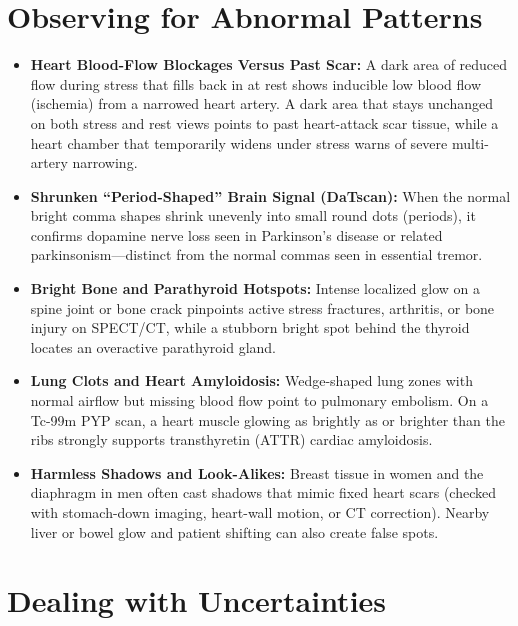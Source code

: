 \section{Observing for Abnormal Patterns}

\begin{itemize}
    \item \textbf{Heart Blood-Flow Blockages Versus Past Scar:} A dark area of reduced flow during stress that fills back in at rest shows inducible low blood flow (ischemia) from a narrowed heart artery. A dark area that stays unchanged on both stress and rest views points to past heart-attack scar tissue, while a heart chamber that temporarily widens under stress warns of severe multi-artery narrowing.
    \item \textbf{Shrunken ``Period-Shaped'' Brain Signal (DaTscan):} When the normal bright comma shapes shrink unevenly into small round dots (periods), it confirms dopamine nerve loss seen in Parkinson's disease or related parkinsonism---distinct from the normal commas seen in essential tremor.
    \item \textbf{Bright Bone and Parathyroid Hotspots:} Intense localized glow on a spine joint or bone crack pinpoints active stress fractures, arthritis, or bone injury on SPECT/CT, while a stubborn bright spot behind the thyroid locates an overactive parathyroid gland.
    \item \textbf{Lung Clots and Heart Amyloidosis:} Wedge-shaped lung zones with normal airflow but missing blood flow point to pulmonary embolism. On a Tc-99m PYP scan, a heart muscle glowing as brightly as or brighter than the ribs strongly supports transthyretin (ATTR) cardiac amyloidosis.
    \item \textbf{Harmless Shadows and Look-Alikes:} Breast tissue in women and the diaphragm in men often cast shadows that mimic fixed heart scars (checked with stomach-down imaging, heart-wall motion, or CT correction). Nearby liver or bowel glow and patient shifting can also create false spots.
\end{itemize}

\section{Dealing with Uncertainties}


